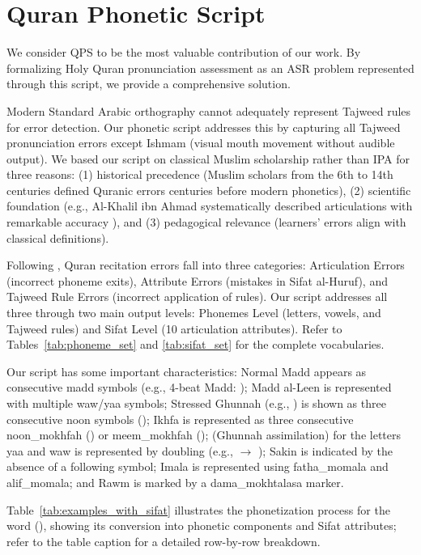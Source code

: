 \section{Quran Phonetic Script}
\label{sec:qps}
We consider QPS to be the most valuable contribution of our work. By formalizing Holy Quran pronunciation assessment as an ASR problem represented through this script, we provide a comprehensive solution.

Modern Standard Arabic orthography cannot adequately represent Tajweed rules for error detection. Our phonetic script addresses this by capturing all Tajweed pronunciation errors except Ishmam (visual mouth movement without audible output). We based our script on classical Muslim scholarship rather than IPA for three reasons: (1) historical precedence (Muslim scholars from the 6th to 14th centuries defined Quranic errors centuries before modern phonetics), (2) scientific foundation (e.g., Al-Khalil ibn Ahmad systematically described articulations with remarkable accuracy \cite{article-khalil}), and (3) pedagogical relevance (learners' errors align with classical definitions).

Following \cite{sweed2021}, Quran recitation errors fall into three categories: Articulation Errors (incorrect phoneme exits), Attribute Errors (mistakes in Sifat al-Huruf), and Tajweed Rule Errors (incorrect application of rules). Our script addresses all three through two main output levels: Phonemes Level (letters, vowels, and Tajweed rules) and Sifat Level (10 articulation attributes). Refer to Tables~\ref{tab:phoneme_set} and \ref{tab:sifat_set} for the complete vocabularies.

Our script has some important characteristics: Normal Madd appears as consecutive madd symbols (e.g., 4-beat Madd: ); Madd al-Leen is represented with multiple waw/yaa symbols; Stressed Ghunnah (e.g., ) is shown as three consecutive noon symbols (); Ikhfa is represented as three consecutive noon\_mokhfah () or meem\_mokhfah ();  (Ghunnah assimilation) for the letters yaa and waw is represented by doubling (e.g.,  $\rightarrow$ ); Sakin is indicated by the absence of a following symbol; Imala is represented using fatha\_momala and alif\_momala; and Rawm is marked by a dama\_mokhtalasa marker.

Table~\ref{tab:examples_with_sifat} illustrates the phonetization process for the word (), showing its conversion into phonetic components and Sifat attributes; refer to the table caption for a detailed row-by-row breakdown.




